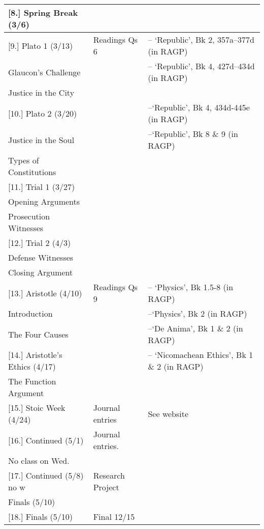 \documentclass[article,oneside]{memoir}
\begin{document}
\begin{landscape}
\begin{center}
\begin{longtable}{p{8cm}p{4cm}p{8cm}}
	
[8.] Spring Break (3/6)		 			& 				    	 &  \\ [1.8\baselineskip]  \hline  

							
[9.] Plato 1 (3/13)					& Readings Qs	6		& -- `Republic', Bk 2, 357a--377d (in RAGP)  \\ 
Glaucon's Challenge					& 	 				& -- `Republic', Bk 4, 427d--434d (in RAGP) \\ 
Justice in the City 					&					&    	\\ [1.8\baselineskip] \hline	

[10.] Plato 2 (3/20)					& 					& --`Republic', Bk 4, 434d-445e (in RAGP) \\
Justice in the Soul	         			& 					& --`Republic', Bk 8 \& 9 (in RAGP)   \\  
Types of Constitutions                    		& 					&   \\ [1.8\baselineskip] \hline	

[11.] Trial 1 (3/27)					&  				&  \\
Opening Arguments				 	&  				&  \\  
Prosecution Witnesses			 	&  				&  \\  [1.8\baselineskip] \hline
                            

[12.] Trial 2  (4/3)					&             		  	&  \\ 
Defense Witnesses			    		& 				&  \\ 
Closing Argument					&  				&  \\  [1.8\baselineskip] \hline

							
							
[13.] Aristotle (4/10)					& Readings Qs 9 		& -- `Physics',  Bk 1.5-8 (in RAGP)  \\ %
Introduction						&					& --`Physics', Bk 2 (in RAGP) \\ 				
The Four Causes					&					& --`De Anima', Bk 1 \& 2 (in RAGP) \\ [1.8\baselineskip] \hline				


[14.] Aristotle's Ethics (4/17)			& 	 				& -- `Nicomachean Ethics', Bk 1 \& 2 (in RAGP) \\
The Function Argument				&					& 	 \\ [1.8\baselineskip] \hline

[15.] Stoic Week (4/24)				& Journal entries 		&  See website \\  [1.8\baselineskip] \hline


[16.] Continued (5/1) 				& Journal entries.			& \\ 
No class on Wed.					& 					& \\ [1.8\baselineskip] \hline
	
[17.] Continued (5/8) no w				& Research Project 	& \\ 
Finals (5/10)						& 				& \\ [1.8\baselineskip] \hline

[18.] Finals (5/10)					& Final 12/15		& \\ [1.8\baselineskip] \hline
	

\end{longtable}
\end{center}
\end{landscape}
\end{document}

